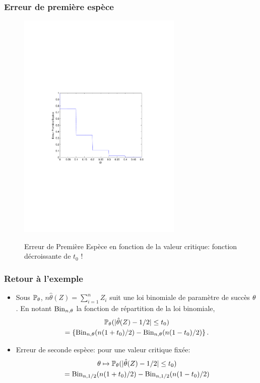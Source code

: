 \begin{frame}
\frametitle{Erreur de première espèce}
\begin{figure}
  \centering
  \includegraphics[width=0.7\textwidth]{ErreurPremiereEspece}\\
  \caption{Erreur de Première Espèce en fonction de la valeur critique: fonction décroissante de $t_0$ !}
\end{figure}

\end{frame}


\begin{frame}
\frametitle{Retour à l'exemple}
\begin{itemize}
\item Sous $\operatorname{{\mathbb P}}_\theta$, $n \hat{\theta}(Z)= \sum_{i=1}^n Z_i$ suit une loi binomiale de paramètre de succès $\theta$.
En notant $\mathrm{Bin}_{n,\theta}$ la fonction
de répartition de la loi binomiale,
\begin{multline*}
\operatorname{{\mathbb P}}_\theta( |\hat{\theta}(Z) - 1/2| \leq t_0 ) \\
= \{\mathrm{Bin}_{n,\theta}(n(1+t_0)/2) - \mathrm{Bin}_{n,\theta}(n(1-t_0)/2) \}  \,.
\end{multline*}
\item \alert{Erreur de seconde espèce}: pour une valeur critique fixée:
\begin{multline*}
\theta \mapsto \operatorname{{\mathbb P}}_{\theta}(|\hat{\theta}(Z) - 1/2| \leq t_0) \\=
\mathrm{Bin}_{n,1/2}(n(1+t_0)/2) - \mathrm{Bin}_{n,1/2}(n(1-t_0)/2)
\end{multline*}
\end{itemize}
\end{frame}


